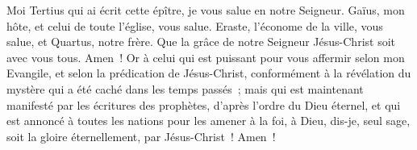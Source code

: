 \begin{multicols}{2}
Moi Tertius qui ai écrit cette épître, je vous salue en notre Seigneur.
Gaïus, mon hôte, et celui de toute l'église, vous salue. Eraste, l'économe de la ville, vous salue, et Quartus, notre frère.
Que la grâce de notre Seigneur Jésus-Christ soit avec vous tous. Amen~!
Or à celui qui est puissant pour vous affermir selon mon Evangile, et selon la prédication de Jésus-Christ, conformément à la révélation du mystère qui a été caché dans les temps passés~;
mais qui est maintenant manifesté par les écritures des prophètes, d'après l'ordre du Dieu éternel, et qui est annoncé à toutes les nations pour les amener à la foi,
à Dieu, dis-je, seul sage, soit la gloire éternellement, par Jésus-Christ~! Amen~!
\PPE{}
\end{multicols}
